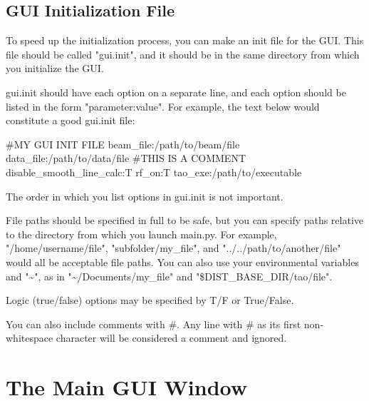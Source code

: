
\subsection{GUI Initialization File}
\label{s:gui.init.file}

To speed up the initialization process, you can make an init file for the GUI.  This file should be called "gui.init", and it should be in the same directory from which you initialize the GUI.

gui.init should have each option on a separate line, and each option should be listed in the form "parameter:value".  For example, the text below would constitute a good gui.init file:

\begin{example}
  #MY GUI INIT FILE
  beam_file:/path/to/beam/file
  data_file:/path/to/data/file
  #THIS IS A COMMENT
  disable_smooth_line_calc:T
  rf_on:T
  tao_exe:/path/to/executable
\end{example}

The order in which you list options in gui.init is not important.

File paths should be specified in full to be safe, but you can specify paths relative to the directory from which you launch main.py.  For example, "/home/username/file", "subfolder/my_file", and "../../path/to/another/file" would all be acceptable file paths.  You can also use your environmental variables and "\textasciitilde{}", as in "\textasciitilde{}/Documents/my_file" and "\$DIST_BASE_DIR/tao/file".

Logic (true/false) options may be specified by T/F or True/False.

You can also include comments with \#.  Any line with \# as its first non-whitespace character will be considered a comment and ignored.


\section{The Main GUI Window}
\label{s:gui.root.window}

